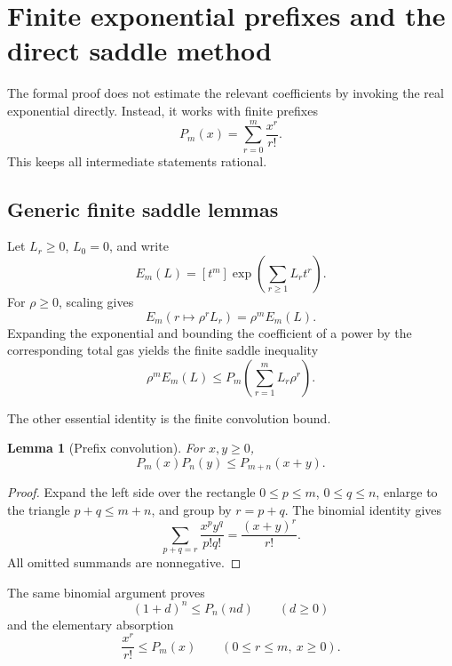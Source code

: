 \documentclass[11pt]{article}
\newtheorem{lemma}[theorem]{Lemma}
\theoremstyle{definition}
\theoremstyle{remark}
\begin{document}
\section{Finite exponential prefixes and the direct saddle method}
\label{sec:saddle}

The formal proof does not estimate the relevant coefficients by invoking the
real exponential directly.  Instead, it works with finite prefixes
\begin{equation}\label{eq:exp-prefix}
  P_m(x)=\sum_{r=0}^m\frac{x^r}{r!}.
\end{equation}
This keeps all intermediate statements rational.

\subsection{Generic finite saddle lemmas}

Let $L_r\ge0$, $L_0=0$, and write
\[
  E_m(L)=[t^m]\exp\left(\sum_{r\ge1}L_rt^r\right).
\]
For $\rho\ge0$, scaling gives
\[
 E_m(r\mapsto \rho^rL_r)=\rho^mE_m(L).
\]
Expanding the exponential and bounding the coefficient of a power by the
corresponding total gas yields the finite saddle inequality
\begin{equation}\label{eq:finite-saddle}
  \rho^mE_m(L)\le
  P_m\left(\sum_{r=1}^mL_r\rho^r\right).
\end{equation}

The other essential identity is the finite convolution bound.

\begin{lemma}[Prefix convolution]\label{lem:prefix-conv}
For $x,y\ge0$,
\begin{equation}\label{eq:prefix-conv}
  P_m(x)P_n(y)\le P_{m+n}(x+y).
\end{equation}
\end{lemma}

\begin{proof}
Expand the left side over the rectangle $0\le p\le m$, $0\le q\le n$,
enlarge to the triangle $p+q\le m+n$, and group by $r=p+q$.  The binomial
identity gives
\[
 \sum_{p+q=r}\frac{x^py^q}{p!q!}
 =\frac{(x+y)^r}{r!}.
\]
All omitted summands are nonnegative.
\end{proof}

The same binomial argument proves
\begin{equation}\label{eq:oneplus-prefix}
  (1+d)^n\le P_n(nd)\qquad(d\ge0)
\end{equation}
and the elementary absorption
\begin{equation}\label{eq:monomial-prefix}
  \frac{x^r}{r!}\le P_m(x)\qquad(0\le r\le m,\ x\ge0).
\end{equation}
\end{document}
